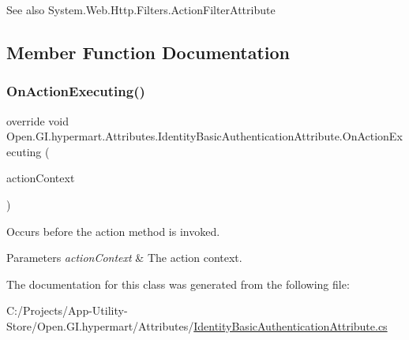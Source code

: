 \begin{DoxySeeAlso}{See also}
System.\+Web.\+Http.\+Filters.\+Action\+Filter\+Attribute


\end{DoxySeeAlso}


\subsection{Member Function Documentation}
\hypertarget{class_open_1_1_g_i_1_1hypermart_1_1_attributes_1_1_identity_basic_authentication_attribute_af9c5fb2bfb2694f6c284d6f1ec81fc38}{}\label{class_open_1_1_g_i_1_1hypermart_1_1_attributes_1_1_identity_basic_authentication_attribute_af9c5fb2bfb2694f6c284d6f1ec81fc38} 
\subsubsection{\texorpdfstring{On\+Action\+Executing()}{OnActionExecuting()}}
{\footnotesize\ttfamily override void Open.\+G\+I.\+hypermart.\+Attributes.\+Identity\+Basic\+Authentication\+Attribute.\+On\+Action\+Executing (\begin{DoxyParamCaption}\item[{Http\+Action\+Context}]{action\+Context }\end{DoxyParamCaption})}



Occurs before the action method is invoked. 


\begin{DoxyParams}{Parameters}
{\em action\+Context} & The action context.\\
\hline
\end{DoxyParams}


The documentation for this class was generated from the following file\+:\begin{DoxyCompactItemize}
\item 
C\+:/\+Projects/\+App-\/\+Utility-\/\+Store/\+Open.\+G\+I.\+hypermart/\+Attributes/\hyperlink{_identity_basic_authentication_attribute_8cs}{Identity\+Basic\+Authentication\+Attribute.\+cs}\end{DoxyCompactItemize}
